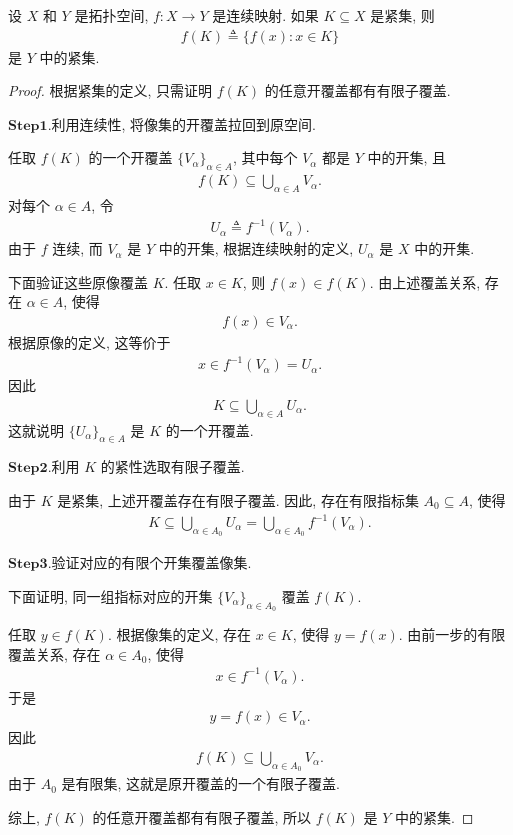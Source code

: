 \documentclass[../../main.tex]{subfiles}%
\begin{document}
\begin{theorem}[紧集的连续像是紧集]\label{theorem:topology-紧集的连续像是紧集}
设 $X$ 和 $Y$ 是拓扑空间, $f:X\to Y$ 是连续映射. 如果 $K\subseteq X$ 是紧集, 则
\begin{align*}
f(K)\triangleq\{f(x):x\in K\}
\end{align*}
是 $Y$ 中的紧集.
\end{theorem}
\begin{proof}
根据紧集的定义, 只需证明 $f(K)$ 的任意开覆盖都有有限子覆盖.

\noindent$\bm{Step}\bm{1}$.{\heiti 利用连续性, 将像集的开覆盖拉回到原空间.}

任取 $f(K)$ 的一个开覆盖 $\{V_\alpha\}_{\alpha\in A}$, 其中每个 $V_\alpha$ 都是 $Y$ 中的开集, 且
\begin{align*}
f(K)\subseteq\bigcup\limits_{\alpha\in A}V_\alpha.
\end{align*}
对每个 $\alpha\in A$, 令
\begin{align*}
U_\alpha\triangleq f^{-1}(V_\alpha).
\end{align*}
由于 $f$ 连续, 而 $V_\alpha$ 是 $Y$ 中的开集, 根据连续映射的定义, $U_\alpha$ 是 $X$ 中的开集.

下面验证这些原像覆盖 $K$. 任取 $x\in K$, 则 $f(x)\in f(K)$. 由上述覆盖关系, 存在 $\alpha\in A$, 使得
\begin{align*}
f(x)\in V_\alpha.
\end{align*}
根据原像的定义, 这等价于
\begin{align*}
x\in f^{-1}(V_\alpha)=U_\alpha.
\end{align*}
因此
\begin{align*}
K\subseteq\bigcup\limits_{\alpha\in A}U_\alpha.
\end{align*}
这就说明 $\{U_\alpha\}_{\alpha\in A}$ 是 $K$ 的一个开覆盖.

\noindent$\bm{Step}\bm{2}$.{\heiti 利用 $K$ 的紧性选取有限子覆盖.}

由于 $K$ 是紧集, 上述开覆盖存在有限子覆盖. 因此, 存在有限指标集 $A_0\subseteq A$, 使得
\begin{align*}
K
\subseteq\bigcup\limits_{\alpha\in A_0}U_\alpha
=\bigcup\limits_{\alpha\in A_0}f^{-1}(V_\alpha).
\end{align*}

\noindent$\bm{Step}\bm{3}$.{\heiti 验证对应的有限个开集覆盖像集.}

下面证明, 同一组指标对应的开集 $\{V_\alpha\}_{\alpha\in A_0}$ 覆盖 $f(K)$.

任取 $y\in f(K)$. 根据像集的定义, 存在 $x\in K$, 使得 $y=f(x)$. 由前一步的有限覆盖关系, 存在 $\alpha\in A_0$, 使得
\begin{align*}
x\in f^{-1}(V_\alpha).
\end{align*}
于是
\begin{align*}
y=f(x)\in V_\alpha.
\end{align*}
因此
\begin{align*}
f(K)\subseteq\bigcup\limits_{\alpha\in A_0}V_\alpha.
\end{align*}
由于 $A_0$ 是有限集, 这就是原开覆盖的一个有限子覆盖.

综上, $f(K)$ 的任意开覆盖都有有限子覆盖, 所以 $f(K)$ 是 $Y$ 中的紧集.
\end{proof}
\end{document}
